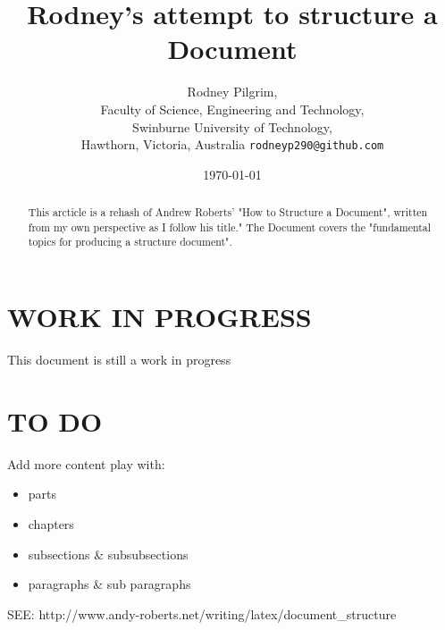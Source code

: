 \documentclass{article}
\begin{document}
\title{Rodney's attempt to structure a \Latex{} Document}
\author{Rodney Pilgrim,\\
	Faculty of Science, Engineering and Technology,\\
	Swinburne University of Technology,\\
	Hawthorn,
	Victoria, 
	Australia
	\texttt{rodneyp290@github.com}}
\date{\today}
\maketitle

\begin{abstract}
This arcticle is a rehash of Andrew Roberts' "How to Structure a \Latex{} Document",\cite{roberts2003}
written from my own perspective as I follow his title." The Document covers the "fundamental topics for
producing a structure document"\cite{roberts2003}.
\end{abstract}

\section{WORK IN PROGRESS}
This document is still a work in progress

\section{TO DO}
Add more content 
play with:
\begin{itemize}
 \item parts
 \item chapters
 \item subsections & subsubsections
 \item paragraphs & sub paragraphs
\end{itemize}

SEE: http://www.andy-roberts.net/writing/latex/document\_structure



\end{document}

